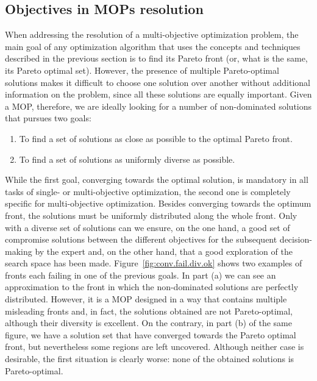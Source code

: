 \subsection{Objectives in MOPs resolution} \label{ssec:Objectives}

When addressing the resolution of a multi-objective optimization problem, the main goal of any optimization algorithm that uses the concepts and techniques described in the previous section is to find its Pareto front (or, what is the same, its Pareto optimal set). However, the presence of multiple Pareto-optimal solutions makes it difficult to choose one solution over another without additional information on the problem, since all these solutions are equally important. Given a MOP, therefore, we are ideally looking for a number of non-dominated solutions that pursues two goals:

\begin{enumerate}
	\item To find a set of solutions as close as possible to the optimal Pareto front.
	\item To find a set of solutions as uniformly diverse as possible.
\end{enumerate}

While the first goal, converging towards the optimal solution, is mandatory in all tasks of single- or multi-objective optimization, the second one is completely specific for multi-objective optimization. Besides converging towards the optimum front, the solutions must be uniformly distributed along the whole front. Only with a diverse set of solutions can we ensure, on the one hand, a good set of compromise solutions between the different objectives for the subsequent decision-making by the expert and, on the other hand, that a good exploration of the search space has been made. Figure~\ref{fig:conv.fail.div.ok} shows two examples of fronts each failing in one of the previous goals. In part (a) we can see an approximation to the front in which the non-dominated solutions are perfectly distributed. However, it is a MOP designed in a way that contains multiple misleading fronts and, in fact, the solutions obtained are not Pareto-optimal, although their diversity is excellent. On the contrary, in part (b) of the same figure, we have a solution set that have converged towards the Pareto optimal front, but nevertheless some regions are left uncovered. Although neither case is desirable, the first situation is clearly worse: none of the obtained solutions is Pareto-optimal.

